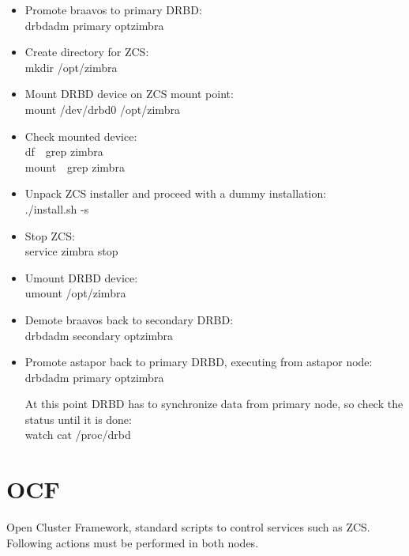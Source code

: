 \documentclass[a4paper, 12pt]{book}
\begin{document}
\begin{itemize}
	\item Promote braavos to primary DRBD:\\
		drbdadm primary optzimbra
		
	\item Create directory for ZCS:\\
		mkdir   /opt/zimbra
		
	\item Mount DRBD device on ZCS mount point:\\
		mount   /dev/drbd0   /opt/zimbra
	
	\item Check mounted device:\\
		df\  \textbar \ grep zimbra\\
		mount\  \textbar \ grep zimbra
		
	\item Unpack ZCS installer and proceed with a dummy installation:\\
		./install.sh -s
		
	\item Stop ZCS:\\
		service zimbra stop
	
	\item Umount DRBD device:\\
		umount   /opt/zimbra
		
	\item Demote braavos back to secondary DRBD:\\
		drbdadm secondary optzimbra
		
	\item Promote astapor back to primary DRBD, executing from astapor node:\\
		drbdadm primary optzimbra
		
\noindent At this point DRBD has to synchronize data from primary node, so check the status until it is done:\\
	watch cat /proc/drbd
	
\end{itemize}



\section{OCF}
\label{sec:ocf}

\noindent Open Cluster Framework, standard scripts to control services such as ZCS. Following actions must be performed in both nodes.
\end{document}
